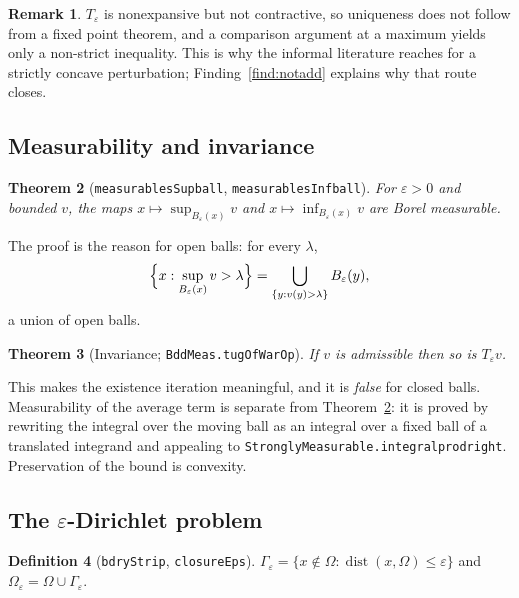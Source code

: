 \documentclass[11pt,reqno]{amsart}
\newcommand{\LEANREF}[1]{\texttt{\small\def\_{\textunderscore\allowbreak}#1}}
\newcommand{\eps}{\varepsilon}
\newcommand{\Op}{T_\eps}
\theoremstyle{plain}
\newtheorem{theorem}{Theorem}[section]
\theoremstyle{definition}
\newtheorem{definition}[theorem]{Definition}
\newtheorem{remark}[theorem]{Remark}
\begin{document}
\begin{remark}\label{rem:notcontractive}
$\Op$ is nonexpansive but not contractive, so uniqueness does not follow from a
fixed point theorem, and a comparison argument at a maximum yields only a
non-strict inequality. This is why the informal literature reaches for a
strictly concave perturbation; Finding~\ref{find:notadd} explains why that
route closes.
\end{remark}

\subsection{Measurability and invariance}

\begin{theorem}[\LEANREF{measurable\_sSup\_ball},
\LEANREF{measurable\_sInf\_ball}]\label{thm:meas}
For $\eps>0$ and bounded $v$, the maps $x \mapsto \sup_{B_\eps(x)} v$ and
$x \mapsto \inf_{B_\eps(x)} v$ are Borel measurable.
\end{theorem}

The proof is the reason for open balls: for every $\lambda$,
\begin{equation}\label{eq:openident}
  \Bigl\{x : \sup_{B_\eps(x)} v > \lambda\Bigr\}
  = \bigcup_{\{y : v(y) > \lambda\}} B_\eps(y),
\end{equation}
a union of open balls.

\begin{theorem}[Invariance; \LEANREF{BddMeas.tugOfWarOp}]\label{thm:invariance}
If $v$ is admissible then so is $\Op v$.
\end{theorem}

This makes the existence iteration meaningful, and it is \emph{false} for
closed balls. Measurability of the average term is separate from
Theorem~\ref{thm:meas}: it is proved by rewriting the integral over the moving
ball as an integral over a fixed ball of a translated integrand and appealing
to \LEANREF{StronglyMeasurable.integral\_prod\_right}. Preservation of the
bound is convexity.

\subsection{The \texorpdfstring{$\eps$}{epsilon}-Dirichlet problem}

\begin{definition}[\LEANREF{bdryStrip}, \LEANREF{closureEps}]\label{def:strip}
$\Gamma_\eps = \{x \notin \Omega : \operatorname{dist}(x,\Omega) \le \eps\}$
and $\Omega_\eps = \Omega \cup \Gamma_\eps$.
\end{definition}
\end{document}
